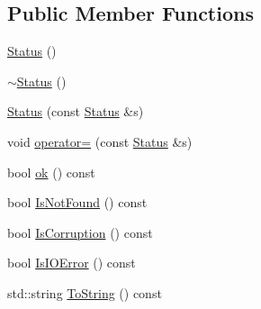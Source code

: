 \subsection*{Public Member Functions}
\begin{DoxyCompactItemize}
\item 
\hyperlink{classleveldb_1_1_status_a941ec793179e81df3032a612cfe5039f}{Status} ()
\item 
\hyperlink{classleveldb_1_1_status_a5f36252202fb791ef8312fe848ffceb3}{$\sim$\+Status} ()
\item 
\hyperlink{classleveldb_1_1_status_a4fef11f480cb940d06c43e600076be13}{Status} (const \hyperlink{classleveldb_1_1_status}{Status} \&s)
\item 
void \hyperlink{classleveldb_1_1_status_a26a147ba1b39730335f5de14285b2c6a}{operator=} (const \hyperlink{classleveldb_1_1_status}{Status} \&s)
\item 
bool \hyperlink{classleveldb_1_1_status_ab31e89a858c766716e3dc952be857c65}{ok} () const 
\item 
bool \hyperlink{classleveldb_1_1_status_ad5462f26196fc04d72221d2fdf1872ca}{Is\+Not\+Found} () const 
\item 
bool \hyperlink{classleveldb_1_1_status_a0e07d12ab4f8d2a3e0b3c1bf435a77db}{Is\+Corruption} () const 
\item 
bool \hyperlink{classleveldb_1_1_status_af200f3aa95b7e455397baabf513673ec}{Is\+I\+O\+Error} () const 
\item 
std\+::string \hyperlink{classleveldb_1_1_status_aa8b56d8fe2cd1873778de5d1e5407866}{To\+String} () const 
\end{DoxyCompactItemize}
